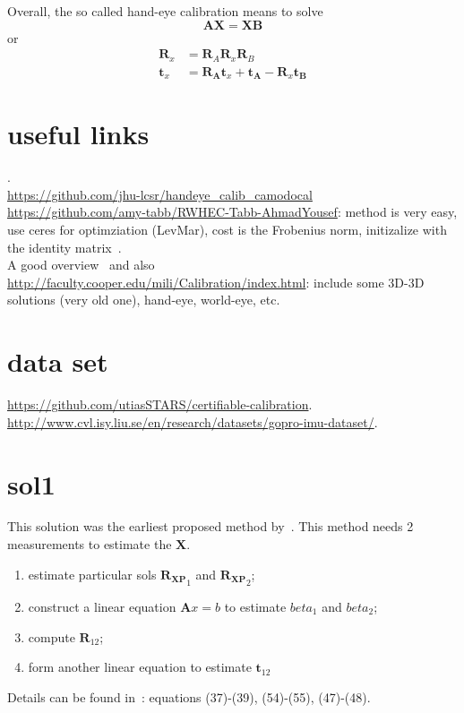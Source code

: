 Overall, the so called hand-eye calibration means to solve 
\begin{equation}
\mathbf{AX=XB}
\end{equation} or 
\begin{align}
\mathbf{R}_x&=\mathbf{R}_A\mathbf{R}_x\mathbf{R}_B \\ 
\mathbf{t}_x&=\mathbf{R_A}\mathbf{t}_x+\mathbf{t_A}-\mathbf{R}_x\mathbf{t_B}
\end{align}

\section{useful links}
\cite{tum_hand_eye}.\\
\url{https://github.com/jhu-lcsr/handeye_calib_camodocal}\\
\url{https://github.com/amy-tabb/RWHEC-Tabb-AhmadYousef}: method is very easy, use ceres for optimziation (LevMar), cost is the Frobenius norm, initizalize with the identity matrix~\cite{tabb2017solving}.\\
A good overview~\cite{shah2012overview} and also \url{http://faculty.cooper.edu/mili/Calibration/index.html}: include some 3D-3D solutions (very old one), hand-eye, world-eye, etc.

\section{data set}
\url{https://github.com/utiasSTARS/certifiable-calibration}.\\ 
\url{http://www.cvl.isy.liu.se/en/research/datasets/gopro-imu-dataset/}.



\section{sol1}
This solution was the earliest proposed method by~\cite{shiu1989calibration}. This method needs 2 measurements to estimate the $\mathbf{X}$. 
\begin{enumerate}
\item estimate particular sols $\mathbf{R_{XP}}_1$ and $\mathbf{R_{XP}}_2$;
\item construct a linear equation $\mathbf{A}x=b$ to estimate $beta_1$ and $beta_2$;
\item compute $\mathbf{R}_{12}$;
\item form another linear equation to estimate $\mathbf{t}_{12}$
\end{enumerate}
Details can be found in~\cite{shiu1989calibration}: equations (37)-(39), (54)-(55), (47)-(48).

